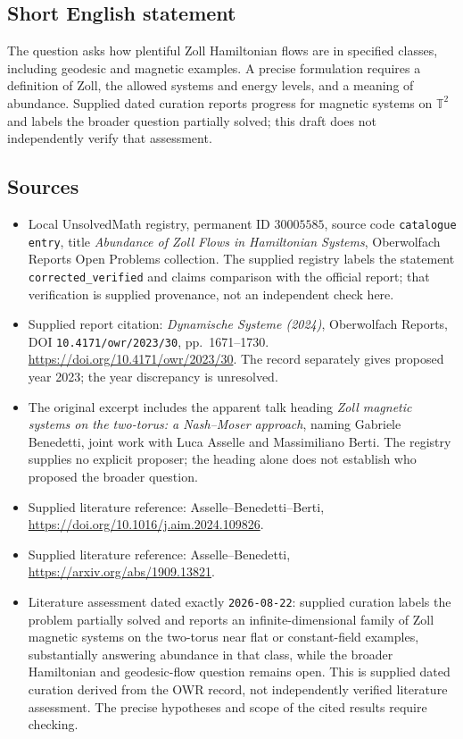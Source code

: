 \documentclass[11pt]{article}
\begin{document}
\subsection{Short English statement}
The question asks how plentiful Zoll Hamiltonian flows are in specified classes, including geodesic and magnetic examples. A precise formulation requires a definition of Zoll, the allowed systems and energy levels, and a meaning of abundance. Supplied dated curation reports progress for magnetic systems on \(\mathbb T^2\) and labels the broader question partially solved; this draft does not independently verify that assessment.
\subsection{Sources}
\begin{itemize}
\item Local UnsolvedMath registry, permanent ID \(30005585\), source code \texttt{catalogue entry}, title \emph{Abundance of Zoll Flows in Hamiltonian Systems}, Oberwolfach Reports Open Problems collection. The supplied registry labels the statement \texttt{corrected\_verified} and claims comparison with the official report; that verification is supplied provenance, not an independent check here.
\item Supplied report citation: \emph{Dynamische Systeme (2024)}, Oberwolfach Reports, DOI \texttt{10.4171/owr/2023/30}, pp.\ 1671--1730. \url{https://doi.org/10.4171/owr/2023/30}. The record separately gives proposed year 2023; the year discrepancy is unresolved.
\item The original excerpt includes the apparent talk heading \emph{Zoll magnetic systems on the two-torus: a Nash--Moser approach}, naming Gabriele Benedetti, joint work with Luca Asselle and Massimiliano Berti. The registry supplies no explicit proposer; the heading alone does not establish who proposed the broader question.
\item Supplied literature reference: Asselle--Benedetti--Berti, \url{https://doi.org/10.1016/j.aim.2024.109826}.
\item Supplied literature reference: Asselle--Benedetti, \url{https://arxiv.org/abs/1909.13821}.
\item Literature assessment dated exactly \texttt{2026-08-22}: supplied curation labels the problem partially solved and reports an infinite-dimensional family of Zoll magnetic systems on the two-torus near flat or constant-field examples, substantially answering abundance in that class, while the broader Hamiltonian and geodesic-flow question remains open. This is supplied dated curation derived from the OWR record, not independently verified literature assessment. The precise hypotheses and scope of the cited results require checking.
\end{itemize}
\end{document}
